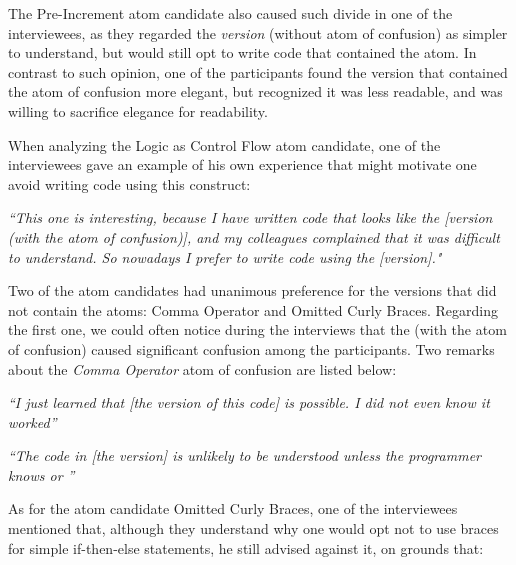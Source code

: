 The Pre-Increment atom candidate also caused such
divide in one of the interviewees, as they
regarded the \emph{\rhs version} (without atom of confusion)
as simpler to understand, but would still opt to write
code that contained the atom. In contrast to such opinion,
one of the participants found the version that contained the atom
of confusion more elegant, but recognized it was less readable,
and was willing to sacrifice elegance for readability.


When analyzing the Logic as Control Flow atom candidate, one of
the interviewees gave an example of his own experience
that might motivate one avoid writing code using this construct:

\begin{mq}
  \emph{``This one is interesting, because I have written
  code that looks like the [\lhs version (with the atom of confusion)],
  and my colleagues complained that it was difficult to understand.
  So nowadays I prefer to write code using the [\rhs version]."}
\end{mq}

Two of the atom candidates had unanimous preference for the
versions that did not contain the atoms: Comma Operator and
Omitted Curly Braces. Regarding the first one, we could
often notice during the interviews that
the \emph{\lhs} (with the atom of confusion) caused significant
confusion among the participants. Two remarks about
the \emph{Comma Operator} atom of confusion are listed below:

\begin{mq}
\emph{``I just learned that [the \lhs version of this code] is possible. I did not even know it worked''}
\end{mq}

\begin{mq}
\emph{``The code in [the \lhs version] is unlikely to be understood unless the programmer knows \clang or \cpplang''}
\end{mq}

As for the atom candidate Omitted Curly Braces, one of the interviewees mentioned that, although they understand why one would opt not to use braces for simple if-then-else statements, he still advised against it, on grounds that:

